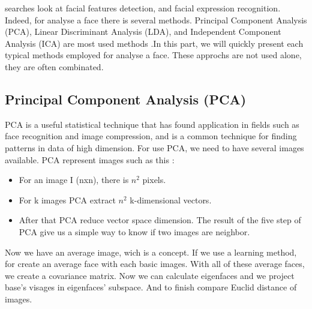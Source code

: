  searches look at facial features detection, and facial expression recognition. Indeed, for analyse a face there is several methods. Principal Component Analysis (PCA), Linear Discriminant Analysis (LDA), and Independent Component Analysis (ICA) are most used methods \cite{Using-Graph}\cite{active-appearance-model}.In this part, we will quickly present each typical methods employed for analyse a face. These approchs are not used alone, they are often combinated\cite{Two-Dimensional}\cite{Active-Shape}.\\
	
	
	\subsection{Principal Component Analysis (PCA)} \leavevmode\par
	PCA\cite{PCA} is a useful statistical technique that has found application in fields such as face recognition and image compression, and is a common technique for finding patterns in data of high dimension. For use PCA, we need to have several images available. PCA represent images such as this :
		\begin{itemize}
		\item For an image I (nxn), there is $n^{2}$ pixels.
		\item For k images PCA extract $n^{2}$ k-dimensional vectors.	
		\item After that PCA reduce vector space dimension. The result of the five step of PCA give us a simple way to know if two images are neighbor.
		\end{itemize}
	
	Now we have an average image, wich is a concept. If we use a learning method, for create an average face with each basic images. With all of these average faces, we create a covariance matrix. Now we can calculate eigenfaces and we project base's visages in eigenfaces' subspace.
	And to finish compare Euclid distance of images.
		
		
